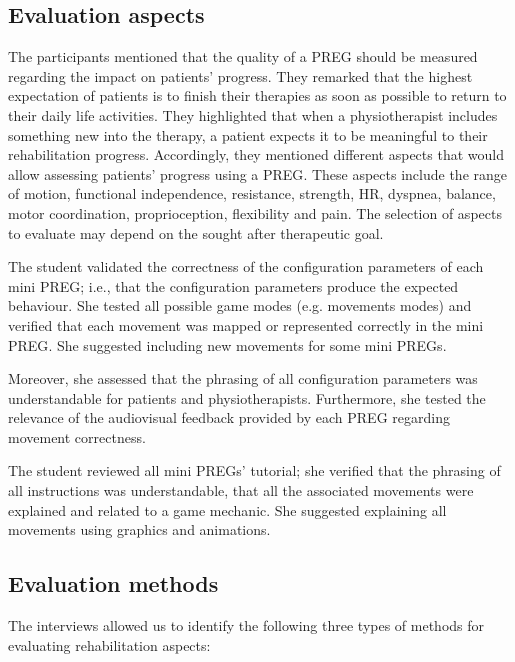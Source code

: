 \subsection{Evaluation aspects}
\label{sec:rehab_aspects}
The participants mentioned that the quality of a \ac{PREG} should be measured regarding the impact on patients' progress. They remarked that the highest expectation of patients is to finish their therapies as soon as possible to return to their daily life activities. They highlighted that when a physiotherapist includes something new into the therapy, a patient expects it to be meaningful to their rehabilitation progress. Accordingly, they mentioned different aspects that would allow assessing patients' progress using a \ac{PREG}. These aspects include the range of motion, functional independence, resistance, strength, \ac{HR}, dyspnea, balance, motor coordination, proprioception, flexibility and pain. The selection of aspects to evaluate may depend on the sought after therapeutic goal.

The student validated the correctness of the configuration parameters of each mini \ac{PREG}; i.e., that the configuration parameters produce the expected behaviour. She tested all possible game modes (e.g. movements modes) and verified that each movement was mapped or represented correctly in the mini \ac{PREG}. She suggested including new movements for some mini \acp{PREG}.

Moreover, she assessed that the phrasing of all configuration parameters was understandable for patients and physiotherapists. Furthermore, she tested the relevance of the audiovisual feedback provided by each \ac{PREG} regarding movement correctness.

The student reviewed all mini \acp{PREG}' tutorial; she verified that the phrasing of all instructions was understandable, that all the associated movements were explained and related to a game mechanic. She suggested explaining all movements using graphics and animations.

\subsection{Evaluation methods}
\label{sec:rehab_methods}
The interviews allowed us to identify the following three types of methods for evaluating rehabilitation aspects:

